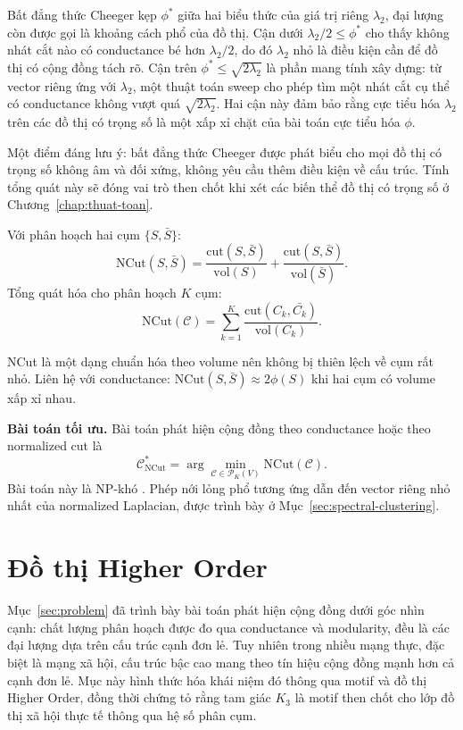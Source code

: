 Bất đẳng thức Cheeger kẹp $\phi^*$ giữa hai biểu thức của giá trị riêng $\lambda_2$, đại lượng còn được gọi là khoảng cách phổ của đồ thị. Cận dưới $\lambda_2 / 2 \leq \phi^*$ cho thấy không nhát cắt nào có conductance bé hơn $\lambda_2 / 2$, do đó $\lambda_2$ nhỏ là điều kiện cần để đồ thị có cộng đồng tách rõ. Cận trên $\phi^* \leq \sqrt{2 \lambda_2}$ là phần mang tính xây dựng: từ vector riêng ứng với $\lambda_2$, một thuật toán sweep cho phép tìm một nhát cắt cụ thể có conductance không vượt quá $\sqrt{2 \lambda_2}$. Hai cận này đảm bảo rằng cực tiểu hóa $\lambda_2$ trên các đồ thị có trọng số là một xấp xỉ chặt của bài toán cực tiểu hóa $\phi$.

Một điểm đáng lưu ý: bất đẳng thức Cheeger được phát biểu cho mọi đồ thị có trọng số không âm và đối xứng, không yêu cầu thêm điều kiện về cấu trúc. Tính tổng quát này sẽ đóng vai trò then chốt khi xét các biến thể đồ thị có trọng số ở Chương~\ref{chap:thuat-toan}.

\begin{definition}
\label{def:ncut}
Với phân hoạch hai cụm $\{S, \bar{S}\}$:
\[
    \mathrm{NCut}(S, \bar{S}) = \frac{\mathrm{cut}(S, \bar{S})}{\mathrm{vol}(S)} + \frac{\mathrm{cut}(S, \bar{S})}{\mathrm{vol}(\bar{S})}.
\]
Tổng quát hóa cho phân hoạch $K$ cụm:
\[
    \mathrm{NCut}(\mathcal{C}) = \sum_{k=1}^K \frac{\mathrm{cut}(C_k, \bar{C_k})}{\mathrm{vol}(C_k)}.
\]
\end{definition}

NCut là một dạng chuẩn hóa theo volume nên không bị thiên lệch về cụm rất nhỏ. Liên hệ với conductance: $\mathrm{NCut}(S, \bar{S}) \approx 2 \phi(S)$ khi hai cụm có volume xấp xỉ nhau.

\textbf{Bài toán tối ưu.} Bài toán phát hiện cộng đồng theo conductance hoặc theo normalized cut là
\[
    \mathcal{C}^*_{\mathrm{NCut}} = \arg\min_{\mathcal{C} \in \mathcal{P}_K(V)} \mathrm{NCut}(\mathcal{C}).
\]
Bài toán này là NP-khó \cite{shi2000}. Phép nới lỏng phổ tương ứng dẫn đến vector riêng nhỏ nhất của normalized Laplacian, được trình bày ở Mục~\ref{sec:spectral-clustering}.

\section{Đồ thị Higher Order}
\label{sec:higher-order}

Mục~\ref{sec:problem} đã trình bày bài toán phát hiện cộng đồng dưới góc nhìn cạnh: chất lượng phân hoạch được đo qua conductance và modularity, đều là các đại lượng dựa trên cấu trúc cạnh đơn lẻ. Tuy nhiên trong nhiều mạng thực, đặc biệt là mạng xã hội, cấu trúc bậc cao mang theo tín hiệu cộng đồng mạnh hơn cả cạnh đơn lẻ. Mục này hình thức hóa khái niệm đó thông qua motif và đồ thị Higher Order, đồng thời chứng tỏ rằng tam giác $K_3$ là motif then chốt cho lớp đồ thị xã hội thực tế thông qua hệ số phân cụm.

